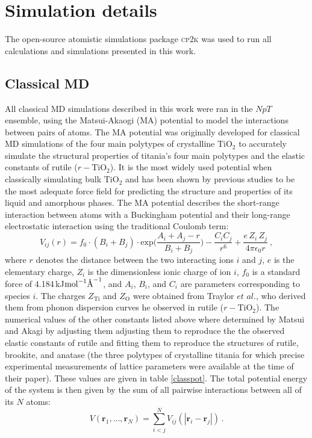 \documentclass[aps,prb,twocolumn,amsmath,amssymb,superscriptaddress,longbibliography]{revtex4-1}
\newcommand{\angstrom}{\text{\normalfont\AA}}
\newcommand\tab[1][1cm]{\hspace*{#1}} %
\begin{document}
\section{Simulation details}

The open-source atomistic simulations package \textsc{cp2k}\cite{cp2k} was used to run all calculations and simulations presented in this work.

\subsection{Classical MD}

\tab All classical MD simulations described in this work were ran in the $NpT$ ensemble, using the Matsui-Akaogi (MA) potential to model the interactions between pairs of atoms.
The MA potential was originally developed for classical MD simulations of the four main polytypes of crystalline $\text{TiO}_2$\cite{MA_og} to accurately simulate the structural properties of titania's four main polytypes and the elastic constants of rutile ($r-\text{TiO}_2$). 
It is the most widely used potential when classically simulating bulk $\text{TiO}_2$ and has been shown by previous studies\cite{smith_collins,fichtorn,vvh1} to be the most adequate force field for predicting the structure and properties of its liquid and amorphous phases.
The MA potential describes the short-range interaction between atoms with a Buckingham potential and their long-range electrostatic interaction using the traditional Coulomb term:
\begin{equation}
V_{ij}(r) = f_{0}\cdot (B_i+B_j)\cdot\text{exp}\big(\frac{A_i + A_j - r}{B_i + B_j}\big) - \frac{C_{i}C_j}{r^6} + \frac{e\,Z_i\,Z_j}{4\pi\epsilon_0 r}\: ,
\end{equation}
where $r$ denotes the distance between the two interacting ions $i$ and $j$, $e$ is the elementary charge, $Z_i$ is the dimensionless ionic charge of ion $i$, $f_0$ is a standard force of 4.184$\,$kJ$\text{mol}^{-1}\angstrom^{-1}$, and $A_i$, $B_i$, and $C_i$ are parameters corresponding to species $i$.
The charges $Z_{\text{Ti}}$ and $Z_{\text{O}}$ were obtained from Traylor $\textit{et al.}$\cite{traylor}, who derived them from phonon dispersion curves he observed in rutile ($r-\text{TiO}_2$).
The numerical values of the other constants listed above where determined by Matsui and Akagi by adjusting them adjusting them to reproduce the the observed elastic constants of rutile and fitting them to reproduce the structures of rutile, brookite, and anatase (the three polytypes of crystalline titania for which precise experimental measurements of lattice parameters were available at the time of their paper). 
These values are given in table \ref{classpot}.
The total potential energy of the system is then given by the sum of all pairwise interactions between all of its $N$ atoms:
\begin{equation}
V(\textbf{r}_1,...,\textbf{r}_N) = \sum_{i<j}^{N} V_{ij}(|\textbf{r}_i - \textbf{r}_j|)\, .
\end{equation}
\end{document}
